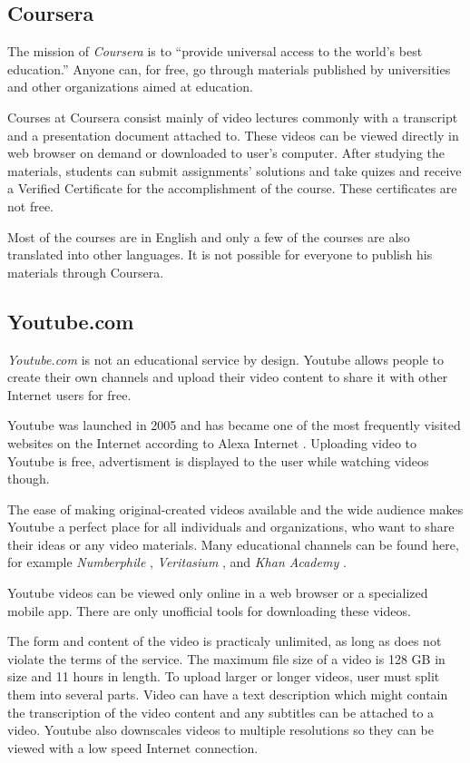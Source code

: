 \subsection{Coursera}
The mission of \textit{Coursera} is to ``provide universal access to the world’s best education.'' \cite{9} Anyone can, for free, go through materials published by universities and other organizations aimed at education.

Courses at Coursera consist mainly of video lectures commonly with a transcript and a presentation document attached to. These videos can be viewed directly in web browser on demand or downloaded to user's computer. After studying the materials, students can submit assignments' solutions and take quizes and receive a Verified Certificate for the accomplishment of the course. These certificates are not free.

Most of the courses are in English and only a few of the courses are also translated into other languages. It is not possible for everyone to publish his materials through Coursera.

\subsection{Youtube.com}
\textit{Youtube.com} \cite{10} is not an educational service by design. Youtube allows people to create their own channels and upload their video content to share it with other Internet users for free.

Youtube was launched in 2005 and has became one of the most frequently visited websites on the Internet according to Alexa Internet \cite{11}. Uploading video to Youtube is free, advertisment is displayed to the user while watching videos though.

The ease of making original-created videos available and the wide audience makes Youtube a perfect place for all individuals and organizations, who want to share their ideas or any video materials. Many educational channels can be found here, for example \textit{Numberphile} \cite{12}, \textit{Veritasium} \cite{13}, and \textit{Khan Academy} \cite{14}.

Youtube videos can be viewed only online in a web browser or a specialized mobile app. There are only unofficial tools for downloading these videos.

The form and content of the video is practicaly unlimited, as long as does not violate the terms of the service. The maximum file size of a video is 128 GB in size and 11 hours in length. To upload larger or longer videos, user must split them into several parts. Video can have a text description which might contain the transcription of the video content and any subtitles can be attached to a video. Youtube also downscales videos to multiple resolutions so they can be viewed with a low speed Internet connection.



